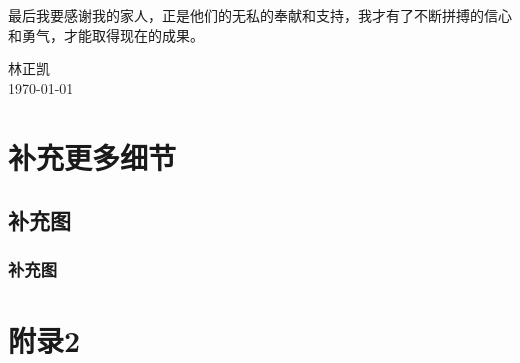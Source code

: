 \documentclass{wzuthesis} %
\begin{document}
最后我要感谢我的家人，正是他们的无私的奉献和支持，我才有了不断拼搏的信心和勇气，才能取得现在的成果。

\vskip 108pt
\begin{flushright}
    林正凯\makebox[1cm]{} \\
    \today
\end{flushright}

\newpage
\makereferences

\newpage
\appendix
\renewcommand{\chaptermark}[1]{\markboth{\songti  附录\thechapter\ ~#1}{}}

\chapter{补充更多细节}

\section{补充图}

\subsection{补充图}

\newclearpage
\chapter{附录2}
\end{document}
